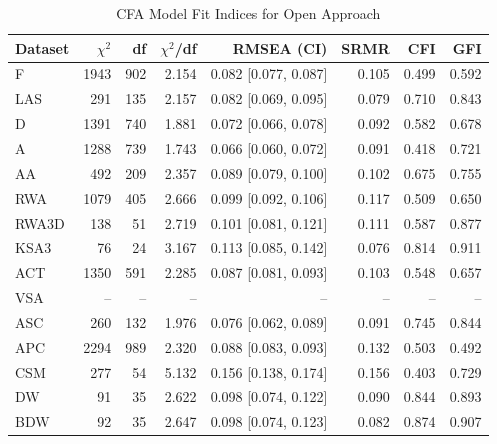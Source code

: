 \begin{table}[t]
\centering
\small
\caption{CFA Model Fit Indices for Open Approach}
\label{tab:cfa-open}
\begin{tabular}{lrrrrrrr}
\toprule
Dataset & $\chi^2$ & df & $\chi^2$/df & RMSEA (CI) & SRMR & CFI & GFI \\
\midrule
\rowcolor{Gray}F & 1943 & 902 & 2.154 & 0.082 [0.077, 0.087] & 0.105 & 0.499 & 0.592 \\
LAS & 291 & 135 & 2.157 & 0.082 [0.069, 0.095] & 0.079 & 0.710 & 0.843 \\
\rowcolor{Gray}D & 1391 & 740 & 1.881 & 0.072 [0.066, 0.078] & 0.092 & 0.582 & 0.678 \\
A & 1288 & 739 & 1.743 & 0.066 [0.060, 0.072] & 0.091 & 0.418 & 0.721 \\
\rowcolor{Gray}AA & 492 & 209 & 2.357 & 0.089 [0.079, 0.100] & 0.102 & 0.675 & 0.755 \\
RWA & 1079 & 405 & 2.666 & 0.099 [0.092, 0.106] & 0.117 & 0.509 & 0.650 \\
\rowcolor{Gray}RWA3D & 138 & 51 & 2.719 & 0.101 [0.081, 0.121] & 0.111 & 0.587 & 0.877 \\
KSA3 & 76 & 24 & 3.167 & 0.113 [0.085, 0.142] & 0.076 & 0.814 & 0.911 \\
\rowcolor{Gray}ACT & 1350 & 591 & 2.285 & 0.087 [0.081, 0.093] & 0.103 & 0.548 & 0.657 \\
VSA & -- & -- & -- & -- & -- & -- & -- \\
\rowcolor{Gray}ASC & 260 & 132 & 1.976 & 0.076 [0.062, 0.089] & 0.091 & 0.745 & 0.844 \\
APC & 2294 & 989 & 2.320 & 0.088 [0.083, 0.093] & 0.132 & 0.503 & 0.492 \\
\rowcolor{Gray}CSM & 277 & 54 & 5.132 & 0.156 [0.138, 0.174] & 0.156 & 0.403 & 0.729 \\
DW & 91 & 35 & 2.622 & 0.098 [0.074, 0.122] & 0.090 & 0.844 & 0.893 \\
\rowcolor{Gray}BDW & 92 & 35 & 2.647 & 0.098 [0.074, 0.123] & 0.082 & 0.874 & 0.907 \\
\bottomrule
\end{tabular}
\end{table}